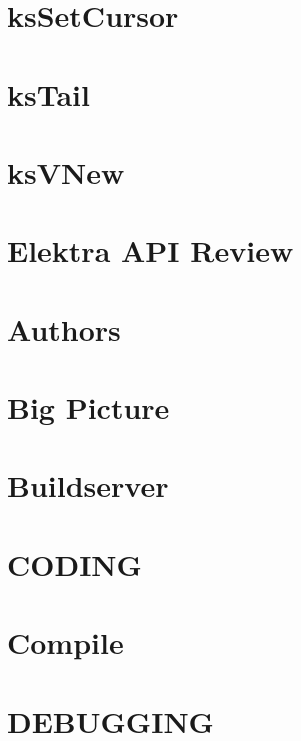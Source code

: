 \let\mypdfximage\pdfximage\def\pdfximage{\immediate\mypdfximage}\documentclass[twoside]{book}
\newcommand{\+}{\discretionary{\mbox{\scriptsize$\hookleftarrow$}}{}{}}
\begin{document}
\chapter{ks\+Set\+Cursor}
\label{doc_api_review_core_ksSetCursor_md}

\chapter{ks\+Tail}
\label{doc_api_review_core_ksTail_md}

\chapter{ks\+VNew}
\label{doc_api_review_core_ksVNew_md}

\chapter{Elektra API Review}
\label{doc_api_review_README_md}

\chapter{Authors}
\label{doc_AUTHORS_md}

\chapter{Big Picture}
\label{doc_BIGPICTURE_md}

\chapter{Buildserver}
\label{doc_BUILDSERVER_md}

\chapter{CODING}
\label{doc_CODING_md}

\chapter{Compile}
\label{doc_COMPILE_md}

\chapter{DEBUGGING}
\label{doc_DEBUGGING_md}

\end{document}
